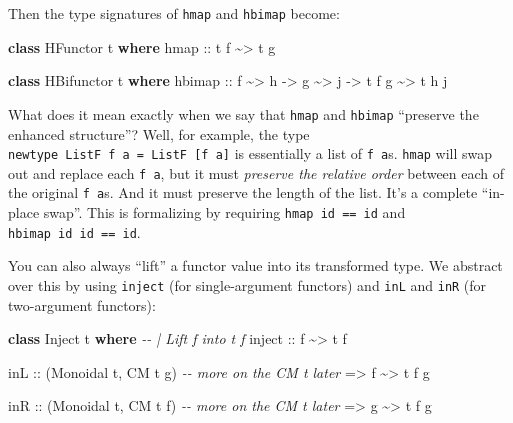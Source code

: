 \documentclass[]{article}
\newenvironment{Shaded}{}{}
\newcommand{\CommentTok}[1]{\textcolor[rgb]{0.38,0.63,0.69}{\textit{#1}}}
\newcommand{\DataTypeTok}[1]{\textcolor[rgb]{0.56,0.13,0.00}{#1}}
\newcommand{\KeywordTok}[1]{\textcolor[rgb]{0.00,0.44,0.13}{\textbf{#1}}}
\newcommand{\NormalTok}[1]{#1}
\newcommand{\OperatorTok}[1]{\textcolor[rgb]{0.40,0.40,0.40}{#1}}
\newcommand{\OtherTok}[1]{\textcolor[rgb]{0.00,0.44,0.13}{#1}}
\begin{document}
Then the type signatures of \texttt{hmap} and \texttt{hbimap} become:

\begin{Shaded}
\begin{Highlighting}[]
\KeywordTok{class} \DataTypeTok{HFunctor}\NormalTok{ t }\KeywordTok{where}
\NormalTok{    hmap}
\OtherTok{        ::}\NormalTok{ t f }\OperatorTok{\textasciitilde{}>}\NormalTok{ t g}

\KeywordTok{class} \DataTypeTok{HBifunctor}\NormalTok{ t }\KeywordTok{where}
\NormalTok{    hbimap}
\OtherTok{        ::}\NormalTok{ f }\OperatorTok{\textasciitilde{}>}\NormalTok{ h}
        \OtherTok{{-}>}\NormalTok{ g }\OperatorTok{\textasciitilde{}>}\NormalTok{ j}
        \OtherTok{{-}>}\NormalTok{ t f g }\OperatorTok{\textasciitilde{}>}\NormalTok{ t h j}
\end{Highlighting}
\end{Shaded}

What does it mean exactly when we say that \texttt{hmap} and \texttt{hbimap}
``preserve the enhanced structure''? Well, for example, the type
\texttt{newtype\ ListF\ f\ a\ =\ ListF\ {[}f\ a{]}} is essentially a list of
\texttt{f\ a}s. \texttt{hmap} will swap out and replace each \texttt{f\ a}, but
it must \emph{preserve the relative order} between each of the original
\texttt{f\ a}s. And it must preserve the length of the list. It's a complete
``in-place swap''. This is formalizing by requiring \texttt{hmap\ id\ ==\ id}
and \texttt{hbimap\ id\ id\ ==\ id}.

You can also always ``lift'' a functor value into its transformed type. We
abstract over this by using \texttt{inject} (for single-argument functors) and
\texttt{inL} and \texttt{inR} (for two-argument functors):

\begin{Shaded}
\begin{Highlighting}[]
\KeywordTok{class} \DataTypeTok{Inject}\NormalTok{ t }\KeywordTok{where}
    \CommentTok{{-}{-} | Lift \textasciigrave{}f\textasciigrave{} into \textasciigrave{}t f\textasciigrave{}}
\OtherTok{    inject ::}\NormalTok{ f }\OperatorTok{\textasciitilde{}>}\NormalTok{ t f}

\OtherTok{inL ::}\NormalTok{ (}\DataTypeTok{Monoidal}\NormalTok{ t, }\DataTypeTok{CM}\NormalTok{ t g)     }\CommentTok{{-}{-} more on the \textasciigrave{}CM t\textasciigrave{} later}
    \OtherTok{=>}\NormalTok{ f }\OperatorTok{\textasciitilde{}>}\NormalTok{ t f g}

\OtherTok{inR ::}\NormalTok{ (}\DataTypeTok{Monoidal}\NormalTok{ t, }\DataTypeTok{CM}\NormalTok{ t f)     }\CommentTok{{-}{-} more on the \textasciigrave{}CM t\textasciigrave{} later}
    \OtherTok{=>}\NormalTok{ g }\OperatorTok{\textasciitilde{}>}\NormalTok{ t f g}
\end{Highlighting}
\end{Shaded}
\end{document}
